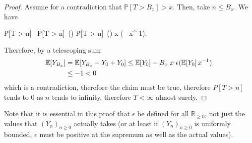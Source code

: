 \begin{proof}
Assume for a contradiction that $\mathbb P[T > B_x] > x$.
Then, take $n \leq B_x$. 
We have
\begin{calculation}
\mathbb P[T > n]\ 
\mathbb P[T > n]\ \epsilon()
\mathbb P[T > n]\ \epsilon\Big(\Big)
x \; \epsilon\big( \, x^{-1}\big).
\end{calculation}
Therefore, by a telescoping sum
\begin{align*}
\mathbb{E}[Y_{B_x}] 
&= \mathbb{E}[Y_{B_x}-Y_0+Y_0] \leq \mathbb{E}[Y_0] - B_x \; x \; \epsilon(\mathbb{E}[Y_0] \, x^{-1})\\
&\leq -1 < 0 
\end{align*}
which is a contradiction, therefore the claim must be true, therefore $P[T > n]$ tends to 0 as $n$ tends to infinity, therefore $T < \infty$ almost surely.
\end{proof}

Note that it is essential in this proof that $\epsilon$ be defined for all $\mathbb R_{\geq 0}$, not just the values that $(Y_n)_{n \geq 0}$ actually takes (or at least if $(Y_n)_{n \geq 0}$ is uniformly bounded, $\epsilon$ must be positive at the supremum as well as the actual values). 

